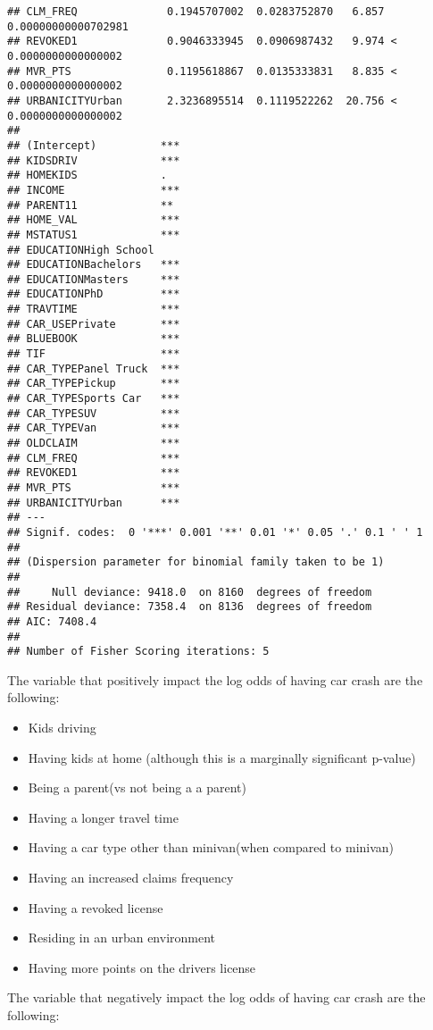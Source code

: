\documentclass[
]{article}
\providecommand{\tightlist}{%
  \setlength{\itemsep}{0pt}\setlength{\parskip}{0pt}}
\begin{document}
\begin{verbatim}
## CLM_FREQ              0.1945707002  0.0283752870   6.857  0.00000000000702981
## REVOKED1              0.9046333945  0.0906987432   9.974 < 0.0000000000000002
## MVR_PTS               0.1195618867  0.0135333831   8.835 < 0.0000000000000002
## URBANICITYUrban       2.3236895514  0.1119522262  20.756 < 0.0000000000000002
##                         
## (Intercept)          ***
## KIDSDRIV             ***
## HOMEKIDS             .  
## INCOME               ***
## PARENT11             ** 
## HOME_VAL             ***
## MSTATUS1             ***
## EDUCATIONHigh School    
## EDUCATIONBachelors   ***
## EDUCATIONMasters     ***
## EDUCATIONPhD         ***
## TRAVTIME             ***
## CAR_USEPrivate       ***
## BLUEBOOK             ***
## TIF                  ***
## CAR_TYPEPanel Truck  ***
## CAR_TYPEPickup       ***
## CAR_TYPESports Car   ***
## CAR_TYPESUV          ***
## CAR_TYPEVan          ***
## OLDCLAIM             ***
## CLM_FREQ             ***
## REVOKED1             ***
## MVR_PTS              ***
## URBANICITYUrban      ***
## ---
## Signif. codes:  0 '***' 0.001 '**' 0.01 '*' 0.05 '.' 0.1 ' ' 1
## 
## (Dispersion parameter for binomial family taken to be 1)
## 
##     Null deviance: 9418.0  on 8160  degrees of freedom
## Residual deviance: 7358.4  on 8136  degrees of freedom
## AIC: 7408.4
## 
## Number of Fisher Scoring iterations: 5
\end{verbatim}

The variable that positively impact the log odds of having car crash are
the following:

\begin{itemize}
\tightlist
\item
  Kids driving
\item
  Having kids at home (although this is a marginally significant
  p-value)
\item
  Being a parent(vs not being a a parent)
\item
  Having a longer travel time
\item
  Having a car type other than minivan(when compared to minivan)
\item
  Having an increased claims frequency
\item
  Having a revoked license
\item
  Residing in an urban environment
\item
  Having more points on the drivers license
\end{itemize}

The variable that negatively impact the log odds of having car crash are
the following:
\end{document}
